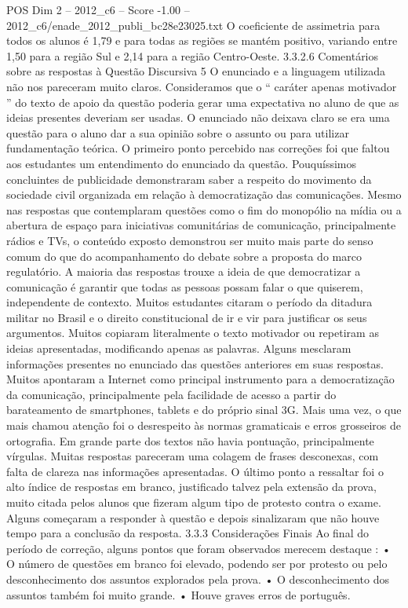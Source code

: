 \begin{textsample}{POS Dim 2 – 2012\_c6 – Score -1.00 – 2012\_c6/enade\_2012\_publi\_bc28e23025.txt}
O coeficiente de assimetria para todos os alunos é 1,79 e para todas as regiões se mantém positivo, variando entre 1,50 para a região Sul e 2,14 para a região Centro-Oeste. 3.3.2.6 Comentários sobre as respostas à Questão Discursiva 5 O enunciado e a linguagem utilizada não nos pareceram muito claros.
Consideramos que o “ caráter apenas motivador ” do texto de apoio da questão poderia gerar uma expectativa no aluno de que as ideias presentes deveriam ser usadas.
O enunciado não deixava claro se era uma questão para o aluno dar a sua opinião sobre o assunto ou para utilizar fundamentação teórica.
O primeiro ponto percebido nas correções foi que faltou aos estudantes um entendimento do enunciado da questão.
Pouquíssimos concluintes de publicidade demonstraram saber a respeito do movimento da sociedade civil organizada em relação à democratização das comunicações.
Mesmo nas respostas que contemplaram questões como o fim do monopólio na mídia ou a abertura de espaço para iniciativas comunitárias de comunicação, principalmente rádios e TVs, o conteúdo exposto demonstrou ser muito mais parte do senso comum do que do acompanhamento do debate sobre a proposta do marco regulatório.
A maioria das respostas trouxe a ideia de que democratizar a comunicação é garantir que todas as pessoas possam falar o que quiserem, independente de contexto.
Muitos estudantes citaram o período da ditadura militar no Brasil e o direito constitucional de ir e vir para justificar os seus argumentos.
Muitos copiaram literalmente o texto motivador ou repetiram as ideias apresentadas, modificando apenas as palavras.
Alguns mesclaram informações presentes no enunciado das questões anteriores em suas respostas.
Muitos apontaram a Internet como principal instrumento para a democratização da comunicação, principalmente pela facilidade de acesso a partir do barateamento de smartphones, tablets e do próprio sinal 3G.
Mais uma vez, o que mais chamou atenção foi o desrespeito às normas gramaticais e erros grosseiros de ortografia.
Em grande parte dos textos não havia pontuação, principalmente vírgulas.
Muitas respostas pareceram uma colagem de frases desconexas, com falta de clareza nas informações apresentadas.
O último ponto a ressaltar foi o alto índice de respostas em branco, justificado talvez pela extensão da prova, muito citada pelos alunos que fizeram algum tipo de protesto contra o exame.
Alguns começaram a responder à questão e depois sinalizaram que não houve tempo para a conclusão da resposta. 3.3.3 Considerações Finais Ao final do período de correção, alguns pontos que foram observados merecem destaque : • O número de questões em branco foi elevado, podendo ser por protesto ou pelo desconhecimento dos assuntos explorados pela prova. • O desconhecimento dos assuntos também foi muito grande. • Houve graves erros de português.

\end{textsample}
